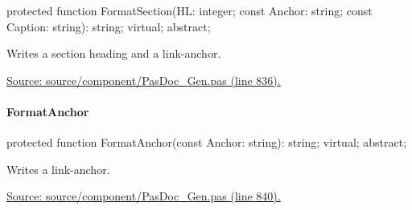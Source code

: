 \documentclass{report}
\newif\ifpdf
\begin{document}
\label{PasDoc_Gen.TDocGenerator-FormatSection}
\begin{list}{}{
\setlength{\itemindent}{0cm}
\setlength{\listparindent}{0cm}
\setlength{\leftmargin}{\evensidemargin}
\addtolength{\leftmargin}{\tmplength}
\settowidth{\labelsep}{X}
\addtolength{\leftmargin}{\labelsep}
\setlength{\labelwidth}{\tmplength}
}
\item[\textbf{Declaration}\hfill]
\ifpdf
\begin{flushleft}
\fi
\begin{ttfamily}
protected function FormatSection(HL: integer; const Anchor: string; const Caption: string): string; virtual; abstract;\end{ttfamily}

\ifpdf
\end{flushleft}
\fi

\par
\item[\textbf{Description}]
Writes a section heading and a link{-}anchor.\par
\href{https://github.com/pasdoc/pasdoc/blob/master/source/component/PasDoc_Gen.pas#L836}{Source: source/component/PasDoc{\_}Gen.pas (line 836).}

\end{list}
\paragraph*{FormatAnchor}\hspace*{\fill}

\label{PasDoc_Gen.TDocGenerator-FormatAnchor}
\begin{list}{}{
\setlength{\itemindent}{0cm}
\setlength{\listparindent}{0cm}
\setlength{\leftmargin}{\evensidemargin}
\addtolength{\leftmargin}{\tmplength}
\settowidth{\labelsep}{X}
\addtolength{\leftmargin}{\labelsep}
\setlength{\labelwidth}{\tmplength}
}
\item[\textbf{Declaration}\hfill]
\ifpdf
\begin{flushleft}
\fi
\begin{ttfamily}
protected function FormatAnchor(const Anchor: string): string; virtual; abstract;\end{ttfamily}

\ifpdf
\end{flushleft}
\fi

\par
\item[\textbf{Description}]
Writes a link{-}anchor.\par
\href{https://github.com/pasdoc/pasdoc/blob/master/source/component/PasDoc_Gen.pas#L840}{Source: source/component/PasDoc{\_}Gen.pas (line 840).}

\end{list}
\end{document}
